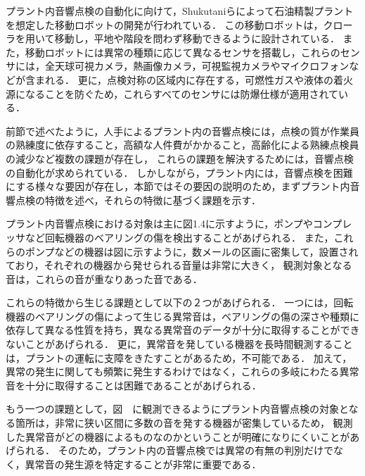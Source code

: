 \documentclass[../main]{subfiles}
\begin{document}
プラント内音響点検の自動化に向けて，Shukutaniらによって石油精製プラントを想定した移動ロボットの開発が行われている．
この移動ロボットは，クローラを用いて移動し，平地や階段を問わず移動できるように設計されている．
また，移動ロボットには異常の種類に応じて異なるセンサを搭載し，これらのセンサには，全天球可視カメラ，熱画像カメラ，可視監視カメラやマイクロフォンなどが含まれる．
更に，点検対称の区域内に存在する，可燃性ガスや液体の着火源になることを防ぐため，これらすべてのセンサには防爆仕様が適用されている．


前節で述べたように，人手によるプラント内の音響点検には，点検の質が作業員の熟練度に依存すること，高額な人件費がかかること，高齢化による熟練点検員の減少など複数の課題が存在し，
これらの課題を解決するためには，音響点検の自動化が求められている．
しかしながら，プラント内には，音響点検を困難にする様々な要因が存在し，本節ではその要因の説明のため，まずプラント内音響点検の特徴を述べ，それらの特徴に基づく課題を示す．

プラント内音響点検における対象は主に図1.4に示すように，ポンプやコンプレッサなど回転機器のベアリングの傷を検出することがあげられる．
また，これらのポンプなどの機器は図に示すように，数メールの区画に密集して，設置されており，それぞれの機器から発せられる音量は非常に大きく，
観測対象となる音は，これらの音が重なりあった音である．

これらの特徴から生じる課題として以下の２つがあげられる．
一つには，回転機器のベアリングの傷によって生じる異常音は，ベアリングの傷の深さや種類に依存して異なる性質を持ち，異なる異常音のデータが十分に取得することができないことがあげられる．
更に，異常音を発している機器を長時間観測することは，プラントの運転に支障をきたすことがあるため，不可能である．
加えて，異常の発生に関しても頻繁に発生するわけではなく，これらの多岐にわたる異常音を十分に取得することは困難であることがあげられる．

もう一つの課題として，図　に観測できるようにプラント内音響点検の対象となる箇所は，非常に狭い区間に多数の音を発する機器が密集しているため，
観測した異常音がどの機器によるものなのかということが明確になりにくいことがあげられる．
そのため，プラント内の音響点検では異常の有無の判別だけでなく，異常音の発生源を特定することが非常に重要である．
\end{document}
